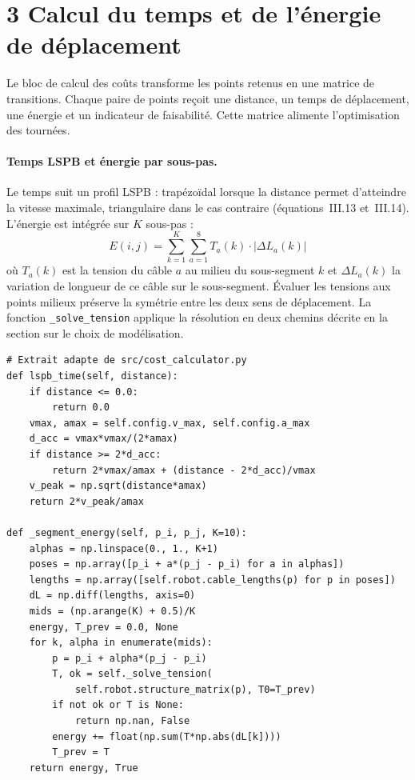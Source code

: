\section*{3 Calcul du temps et de l'énergie de déplacement}
\vspace{-0.3em}
Le bloc de calcul des coûts transforme les points retenus en une matrice de transitions. Chaque paire de points reçoit une distance, un temps de déplacement, une énergie et un indicateur de faisabilité. Cette matrice alimente l'optimisation des tournées.

\paragraph{Temps LSPB et énergie par sous-pas.}
Le temps suit un profil LSPB : trapézoïdal lorsque la distance permet d'atteindre la vitesse maximale, triangulaire dans le cas contraire (équations~III.13 et~III.14). L'énergie est intégrée sur $K$ sous-pas :
\[
E(i,j) = \sum_{k=1}^{K} \sum_{a=1}^{8} T_a(k) \cdot |\Delta L_a(k)|
\]
où $T_a(k)$ est la tension du câble $a$ au milieu du sous-segment $k$ et $\Delta L_a(k)$ la variation de longueur de ce câble sur le sous-segment. Évaluer les tensions aux points milieux préserve la symétrie entre les deux sens de déplacement. La fonction \texttt{\_solve\_tension} applique la résolution en deux chemins décrite en la section sur le choix de modélisation.

\begin{lstlisting}[caption={Calcul du temps LSPB et integration quasi-statique de l'energie},label={lst:B3}]
# Extrait adapte de src/cost_calculator.py
def lspb_time(self, distance):
    if distance <= 0.0:
        return 0.0
    vmax, amax = self.config.v_max, self.config.a_max
    d_acc = vmax*vmax/(2*amax)
    if distance >= 2*d_acc:
        return 2*vmax/amax + (distance - 2*d_acc)/vmax
    v_peak = np.sqrt(distance*amax)
    return 2*v_peak/amax

def _segment_energy(self, p_i, p_j, K=10):
    alphas = np.linspace(0., 1., K+1)
    poses = np.array([p_i + a*(p_j - p_i) for a in alphas])
    lengths = np.array([self.robot.cable_lengths(p) for p in poses])
    dL = np.diff(lengths, axis=0)
    mids = (np.arange(K) + 0.5)/K
    energy, T_prev = 0.0, None
    for k, alpha in enumerate(mids):
        p = p_i + alpha*(p_j - p_i)
        T, ok = self._solve_tension(
            self.robot.structure_matrix(p), T0=T_prev)
        if not ok or T is None:
            return np.nan, False
        energy += float(np.sum(T*np.abs(dL[k])))
        T_prev = T
    return energy, True
\end{lstlisting}

